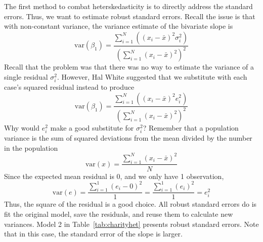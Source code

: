 The first method to combat heterskedasticity is to directly address the standard errors. Thus, we want to estimate robust standard errors. Recall the issue is that with non-constant variance, the variance estimate of the bivariate slope is
\begin{equation}
\mbox{var}\left(\beta_1\right)=\frac{\sum_{i=1}^N\left(\left(x_i-\bar{x}\right)^2\sigma_i^2\right)}{\left(\sum_{i=1}^N\left(x_i-\bar{x}\right)^2\right)^2}
\end{equation}
Recall that the problem was that there was no way to estimate the variance of a single residual $\sigma_i^2$. However, Hal White suggested that we substitute with each case's squared residual instead to produce
\begin{equation}
\mbox{var}\left(\beta_1\right)=\frac{\sum_{i=1}^N\left(\left(x_i-\bar{x}\right)^2e_i^2\right)}{\left(\sum_{i=1}^N\left(x_i-\bar{x}\right)^2\right)^2}
\end{equation}
Why would $e_i^2$ make a good substitute for $\sigma_i^2$? Remember that a population variance is the sum of squared deviations from the mean divided by the number in the population
\[
\mbox{var}\left(x\right)=\frac{\sum_{i=1}^N\left(x_i-\bar{x}\right)^2}{N}
\]
Since the expected mean residual is 0, and we only have 1 observation,
\[
\mbox{var}\left(e\right)=\frac{\sum_{i=1}^1\left(e_i-0\right)^2}{1}=\frac{\sum_{i=1}^1\left(e_i\right)^2}{1}=e_i^2
\]
Thus, the square of the residual is a good choice. All robust standard errors do is fit the original model, save the residuals, and reuse them to calculate new variances. Model 2 in Table~\ref{tab:charityhet} presents robust standard errors. Note that in this case, the standard error of the slope is larger.

